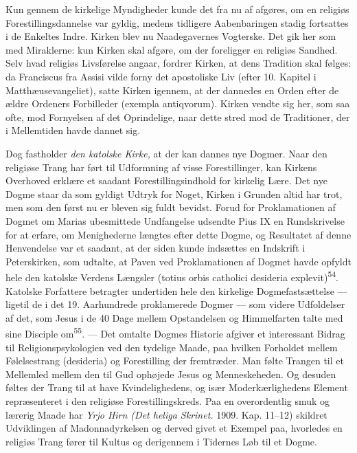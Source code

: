 \documentclass[12pt,a4paper,openany]{book}
\newcommand{\opage}[1]{\marginnote{\footnotesize\textit{[#1]}}}
\begin{document}
Kun gennem de kirkelige Myndigheder kunde det fra nu af afgøres, om en
religiøs Forestillingsdannelse var gyldig, medens tidligere
Aabenbaringen stadig fortsattes i de Enkeltes Indre. Kirken blev nu
Naadegavernes Vogterske. Det gik her som med Miraklerne: kun Kirken skal
afgøre, om der foreligger en religiøs Sandhed. Selv hvad religiøs
Livsførelse angaar, fordrer Kirken, at dens Tradition skal følges: da
Franciscus fra Assisi vilde forny det apostoliske Liv (efter 10. Kapitel
i Matthæusevangeliet), satte Kirken igennem, at der dannedes en Orden
efter de ældre Ordeners Forbilleder (exempla antiqvorum). Kirken vendte
sig her, som saa ofte, mod Fornyelsen af det Oprindelige, naar dette
stred mod de Traditioner, der i Mellemtiden havde dannet sig.

Dog fastholder \textit{den katolske Kirke,} at der kan dannes nye
Dogmer. Naar den religiøse Trang har ført til Udformning af visse
Forestillinger, kan Kirkens Overhoved erklære et saadant
Forestillingsindhold for kirkelig Lære. Det nye Dogme staar da som
gyldigt Udtryk for Noget, Kirken i Grunden altid har trot, men som den
først nu er bleven sig fuldt bevidst. Forud for Proklamationen af Dogmet
om Marias ubesmittede Undfangelse udsendte Pius IX en Rundskrivelse for
at erfare, om Menighederne længtes efter dette Dogme, og Resultatet af
denne Henvendelse var et saadant, at der siden kunde indsættes en
Indskrift i Peterskirken, som udtalte, at Paven ved Proklamationen af
Dogmet havde opfyldt hele den katolske Verdens Længsler (totius orbis
catholici desideria explevit)\textsuperscript{54}. Katolske Forfattere
betragter undertiden hele den kirkelige Dogmefastsættelse --- ligetil de
i det 19. Aarhundrede proklamerede Dogmer --- som videre Udfoldelser af
det, som Jesus i de 40 Dage mellem Opstandelsen og Himmelfarten talte
med sine Disciple om\textsuperscript{55}. --- Det omtalte Dogmes
Historie afgiver et interessant Bidrag til Religionspsykologien ved den
tydelige Maade, paa hvilken Forholdet mellem Følelsestrang (desideria)
og Forestilling der fremtræder. Man følte Trangen til et Mellemled
mellem den til Gud ophøjede Jesus og Menneskeheden. Og desuden føltes
der Trang til at have Kvindelighedens, og især Moderkærlighedens Element
repræsenteret i den religiøse Forestillingskreds. Paa en overordentlig
smuk og lærerig Maade har \textit{Yrjo Hirn (Det heliga Skrinet.} 1909.
Kap.
\opage{115}11--12) skildret Udviklingen af Madonnadyrkelsen og derved
givet et Exempel paa, hvorledes en religiøs Trang fører til Kultus og
derigennem i Tidernes Løb til et Dogme.
\end{document}

